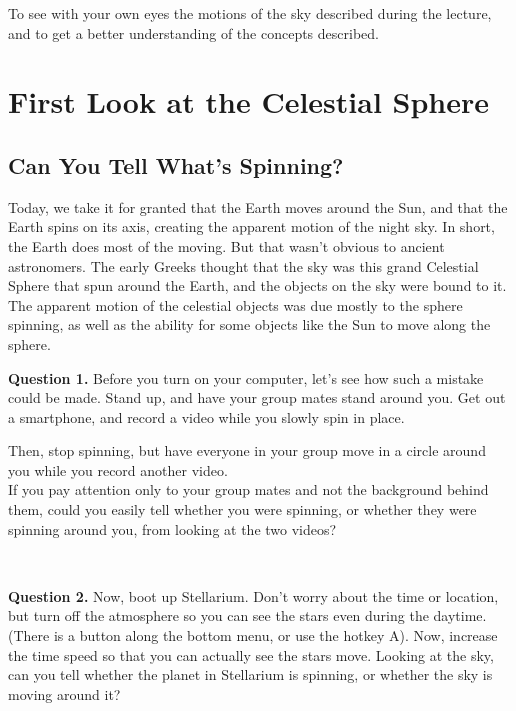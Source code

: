 \documentclass[11pt]{article}
\begin{document}
To see with your own eyes the motions of the sky described during the lecture, and to get a better understanding of the concepts described.

\newpage

\section{First Look at the Celestial Sphere}

\subsection{Can You Tell What's Spinning?}

Today, we take it for granted that the Earth moves around the Sun, and that the Earth spins on its axis, creating the apparent motion of the night sky. In short, the Earth does most of the moving. But that wasn't obvious to ancient astronomers. The early Greeks thought that the sky was this grand Celestial Sphere that spun around the Earth, and the objects on the sky were bound to it. The apparent motion of the celestial objects was due mostly to the sphere spinning, as well as the ability for some objects like the Sun to move along the sphere.

\noindent
\textbf{Question 1.} Before you turn on your computer, let's see how such a mistake could be made. Stand up, and have your group mates stand around you. Get out a smartphone, and record a video while you slowly spin in place. 

Then, stop spinning, but have everyone in your group move in a circle around you while you record another video.\\

If you pay attention only to your group mates and not the background behind them, could you easily tell whether you were spinning, or whether they were spinning around you, from looking at the two videos?\\
\vspace*{1.5cm}

\hrulefill\\
\noindent

\textbf{Question 2.} Now, boot up Stellarium. Don't worry about the time or location, but turn off the atmosphere so you can 
see the stars even during the daytime.
(There is a button along the bottom menu, or use the hotkey A). Now, increase the time speed so that you can actually see the stars move. Looking at the sky, can you tell whether the planet in Stellarium is spinning, or whether the sky is moving around it?\\
\vspace*{1.5cm}
\end{document}

